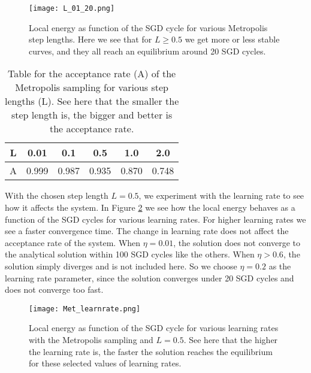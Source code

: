 \documentclass[12pt,a4paper,english]{article}
\begin{document}
\begin{figure}[htbp!]
	\centering\texttt{[image: L\_01\_20.png]}
	\caption{Local energy as function of the SGD cycle for various Metropolis step lengths. Here we see that for $L\geq0.5$ we get more or less stable curves, and they all reach an equilibrium around 20 SGD cycles. \label{fig:check_L}}
\end{figure} 

\begin{table}[htbp!]
	\centering
	\begin{tabular}{|c|c|c|c|c|c|}
		\hline \rule{0pt}{13pt}
		L & 0.01 & 0.1 & 0.5 & 1.0 & 2.0 \\
		\hline \rule{0pt}{13pt}
		A & 0.999 &  0.987 & 0.935 & 0.870 & 0.748 \\
		\hline
	\end{tabular}
	\caption{Table for the acceptance rate (A) of the Metropolis sampling for various step lengths (L). See here that the smaller the step length is, the bigger and better is the acceptance rate. \label{tab:Met_A}}
\end{table}

With the chosen step length $L=0.5$, we experiment with the learning rate to see how it affects the system. In Figure \ref{fig:check_learnrate_Met} we see how the local energy behaves as a function of the SGD cycles for various learning rates. For higher learning rates we see a faster convergence time. The change in learning rate does not affect the acceptance rate of the system. When $\eta=0.01$, the solution does not converge to the analytical solution within 100 SGD cycles like the others. When $\eta>0.6$, the solution simply diverges and is not included here. So we choose $\eta=0.2$ as the learning rate parameter, since the solution converges under 20 SGD cycles and does not converge too fast.

\begin{figure}[htbp!]
	\centering\texttt{[image: Met\_learnrate.png]}
	\caption{Local energy as function of the SGD cycle for various learning rates with the Metropolis sampling and $L=0.5$. See here that the higher the learning rate is, the faster the solution reaches the equilibrium for these selected values of learning rates. \label{fig:check_learnrate_Met}}
\end{figure} 
\end{document}
